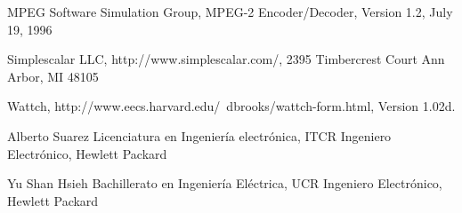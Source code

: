 \documentclass[journal]{IEEEtran}
\begin{document}
\begin{thebibliography}{1}
MPEG Software Simulation Group, MPEG-2 Encoder/Decoder, Version 1.2, July 19, 1996

Simplescalar LLC, http://www.simplescalar.com/, 2395 Timbercrest Court Ann Arbor, MI 48105

Wattch, http://www.eecs.harvard.edu/~dbrooks/wattch-form.html, Version 1.02d.

\end{thebibliography}

\begin{IEEEbiographynophoto}{Alberto Suarez}
Licenciatura en Ingenier\'ia electr\'onica, ITCR
Ingeniero Electr\'{o}nico, Hewlett Packard
\end{IEEEbiographynophoto}

\begin{IEEEbiographynophoto}{Yu Shan Hsieh}
Bachillerato en Ingenier\'{i}a El\'{e}ctrica, UCR
Ingeniero Electr\'{o}nico, Hewlett Packard
\end{IEEEbiographynophoto}
\end{document}
